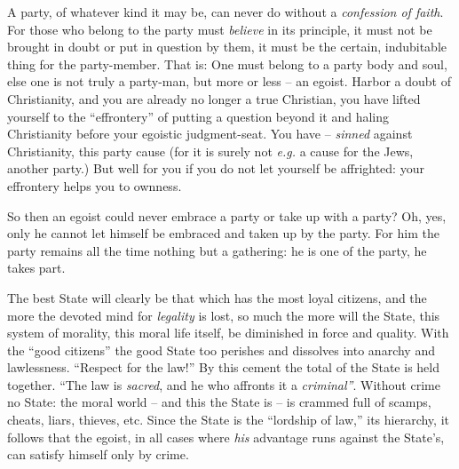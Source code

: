 A party, of whatever kind it may be, can never do without a \textit{confession 
of faith}. For those who belong to the party must \textit{believe} in its 
principle, it must not be brought in doubt or put in question by them, it must 
be the certain, indubitable thing for the party-member. That is: One must 
belong to a party body and soul, else one is not truly a party-man, but more 
or less -- an egoist. Harbor a doubt of Christianity, and you are already no 
longer a true Christian, you have lifted yourself to the ``effrontery'' of 
putting a question beyond it and haling Christianity before your egoistic 
judgment-seat. You have -- \textit{sinned} against Christianity, this party 
cause (for it is surely not \textit{e.g.} a cause for the Jews, another 
party.) But well for you if you do not let yourself be affrighted: your 
effrontery helps you to ownness.

So then an egoist could never embrace a party or take up with a party? Oh, 
yes, only he cannot let himself be embraced and taken up by the party. For him 
the party remains all the time nothing but a gathering: he is one of the 
party, he takes part.

\myhrule


The best State will clearly be that which has the most loyal citizens, and the 
more the devoted mind for \textit{legality} is lost, so much the more will the 
State, this system of morality, this moral life itself, be diminished in force 
and quality. With the ``good citizens'' the good State too perishes and 
dissolves into anarchy and lawlessness. ``Respect for the law!'' By this 
cement the total of the State is held together. ``The law is \textit{sacred}, 
and he who affronts it a \textit{criminal''}. Without crime no State: the 
moral world -- and this the State is -- is crammed full of scamps, cheats, 
liars, thieves, etc. Since the State is the ``lordship of law,'' its 
hierarchy, it follows that the egoist, in all cases where \textit{his} 
advantage runs against the State's, can satisfy himself only by crime.


